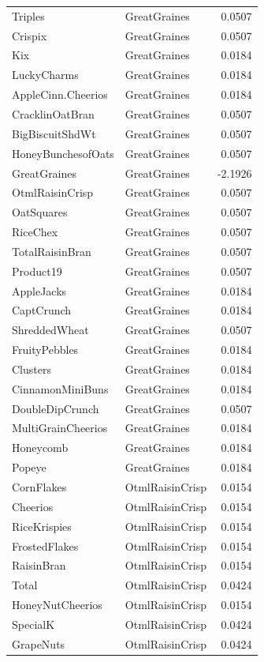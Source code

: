 \begin{longtable}{llr}
Triples & GreatGraines & 0.0507 \\
Crispix & GreatGraines & 0.0507 \\
Kix & GreatGraines & 0.0184 \\
LuckyCharms & GreatGraines & 0.0184 \\
AppleCinn.Cheerios & GreatGraines & 0.0184 \\
CracklinOatBran & GreatGraines & 0.0507 \\
BigBiscuitShdWt & GreatGraines & 0.0507 \\
HoneyBunchesofOats & GreatGraines & 0.0507 \\
GreatGraines & GreatGraines & -2.1926 \\
OtmlRaisinCrisp & GreatGraines & 0.0507 \\
OatSquares & GreatGraines & 0.0507 \\
RiceChex & GreatGraines & 0.0507 \\
TotalRaisinBran & GreatGraines & 0.0507 \\
Product19 & GreatGraines & 0.0507 \\
AppleJacks & GreatGraines & 0.0184 \\
CaptCrunch & GreatGraines & 0.0184 \\
ShreddedWheat & GreatGraines & 0.0507 \\
FruityPebbles & GreatGraines & 0.0184 \\
Clusters & GreatGraines & 0.0184 \\
CinnamonMiniBuns & GreatGraines & 0.0184 \\
DoubleDipCrunch & GreatGraines & 0.0507 \\
MultiGrainCheerios & GreatGraines & 0.0184 \\
Honeycomb & GreatGraines & 0.0184 \\
Popeye & GreatGraines & 0.0184 \\
CornFlakes & OtmlRaisinCrisp & 0.0154 \\
Cheerios & OtmlRaisinCrisp & 0.0154 \\
RiceKrispies & OtmlRaisinCrisp & 0.0154 \\
FrostedFlakes & OtmlRaisinCrisp & 0.0154 \\
RaisinBran & OtmlRaisinCrisp & 0.0154 \\
Total & OtmlRaisinCrisp & 0.0424 \\
HoneyNutCheerios & OtmlRaisinCrisp & 0.0154 \\
SpecialK & OtmlRaisinCrisp & 0.0424 \\
GrapeNuts & OtmlRaisinCrisp & 0.0424 \\

\end{longtable}
